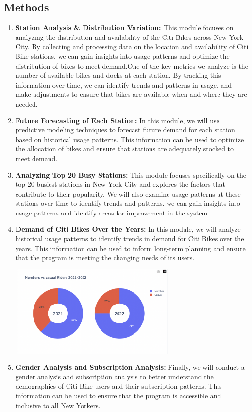 \documentclass[journal]{vgtc}                     %
\begin{document}
\subsection{Methods}
\begin{enumerate}
\item \textbf{Station Analysis \& Distribution Variation: \cite{11}} This module focuses on analyzing the distribution and availability of the Citi Bikes across New York City. By collecting and processing data on the location and availability of Citi Bike stations, we can gain insights into usage patterns and optimize the distribution of bikes to meet demand.One of the key metrics we analyze is the number of available bikes and docks at each station. By tracking this information over time, we can identify trends and patterns in usage, and make adjustments to ensure that bikes are available when and where they are needed.
\item \textbf{Future Forecasting of Each Station:} In this module, we will use predictive modeling techniques to forecast future demand for each station based on historical usage patterns. This information can be used to optimize the allocation of bikes and ensure that stations are adequately stocked to meet demand.
\item \textbf{Analyzing Top 20 Busy Stations:} This module focuses specifically on the top 20 busiest stations in New York City and explores the factors that contribute to their popularity. We will also examine usage patterns at these stations over time to identify trends and patterns. we can gain insights into usage patterns and identify areas for improvement in the system.
\item \textbf{Demand of Citi Bikes Over the Years:} In this module, we will analyze historical usage patterns to identify trends in demand for Citi Bikes over the years. This information can be used to inform long-term planning and ensure that the program is meeting the changing needs of its users.
\parbox{\linewidth}{
        \includegraphics[width=3.3in, height=1.8in]{figs/subsc.png}\\
        }
\item \textbf{Gender Analysis and Subscription Analysis:} Finally, we will conduct a gender analysis and subscription analysis to better understand the demographics of Citi Bike users and their subscription patterns. This information can be used to ensure that the program is accessible and inclusive to all New Yorkers.
\end{enumerate}
\end{document}
